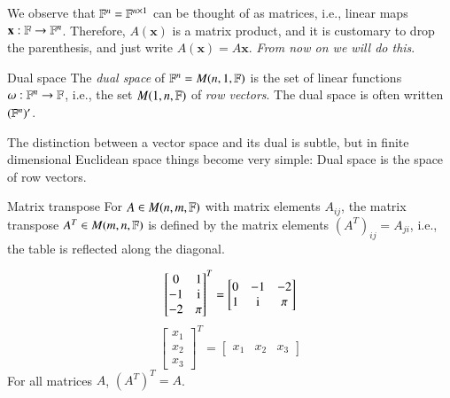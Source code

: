 We observe that $\mathbb{F}^n = \mathbb{F}^{n\times 1}$ can be thought of as matrices, i.e., linear maps $\mathbf{x}: \mathbb{F}\to\mathbb{F}^n$. Therefore, $A(\mathbf{x})$ is a matrix product, and it is customary to drop the parenthesis, and just write $A(\mathbf{x}) = A\mathbf{x}$. \emph{From now on we will do this}.

\begin{myDefinition}{Dual space}{}
    The \emph{dual space} of $\mathbb{F}^{n}=M(n,1,\mathbb{F})$ is the set of linear functions $\omega : \mathbb{F}^n \to \mathbb{F}$, i.e., the set $M(1,n,\mathbb{F})$ of \emph{row vectors}. The dual space is often written $(\mathbb{F}^n)'$.
\end{myDefinition}

The distinction between a vector space and its dual is subtle, but in finite dimensional Euclidean space things become very simple: Dual space is the space of row vectors.




\begin{myDefinition}{Matrix transpose}{}
    For $A \in M(n,m,\mathbb{F})$ with matrix elements $A_{ij}$, the matrix transpose $A^T \in M(m,n,\mathbb{F})$ is defined by the matrix elements $(A^T)_{ij} = A_{ji}$, i.e., the table is reflected along the diagonal.
\end{myDefinition}

\begin{myExample}{}{}
    \begin{equation}
        \begin{bmatrix} 0 & 1 \\ -1 & \mathrm{i} \\ -2 & \pi \end{bmatrix}^T = \begin{bmatrix}  0 & -1 & -2 \\ 1 & \mathrm{i} & \pi \end{bmatrix} 
    \end{equation}
    \begin{equation}
        \begin{bmatrix} x_1 \\ x_2 \\ x_3 \end{bmatrix}^T = \begin{bmatrix} x_1 & x_2 & x_3 \end{bmatrix}
    \end{equation}
    For all matrices $A$, $(A^T)^T = A$.
\end{myExample}


